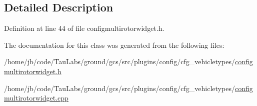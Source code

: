 \subsection{\-Detailed \-Description}


\-Definition at line 44 of file configmultirotorwidget.\-h.



\-The documentation for this class was generated from the following files\-:\begin{DoxyCompactItemize}
\item 
/home/jb/code/\-Tau\-Labs/ground/gcs/src/plugins/config/cfg\-\_\-vehicletypes/\hyperlink{configmultirotorwidget_8h}{configmultirotorwidget.\-h}\item 
/home/jb/code/\-Tau\-Labs/ground/gcs/src/plugins/config/cfg\-\_\-vehicletypes/\hyperlink{configmultirotorwidget_8cpp}{configmultirotorwidget.\-cpp}\end{DoxyCompactItemize}
